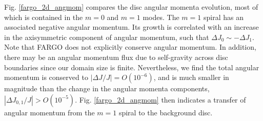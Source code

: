 Fig. \ref{fargo_2d_angmom} compares the disc angular momenta
evolution, most of which is contained in the $m=0$ and $m=1$ modes. 
The $m=1$ spiral has an associated negative angular
momentum. Its growth is correlated with an increase in the axisymmetric
component of angular momentum, such that $\Delta J_0 \sim - \Delta
J_1$. Note that FARGO does not explicitly conserve angular
momentum. In addition, there may be an angular momentum flux due to
self-gravity across disc boundaries since our domain size is finite. 
Nevertheless, we find the total angular momentum is conserved to 
$|\Delta J/J|= O(10^{-6})$, and is much smaller in magnitude than the change in the
angular momenta components, $|\Delta J_{0,1}/J|> O(10^{-5})$. 
Fig. \ref{fargo_2d_angmom} then indicates a transfer of 
angular momentum from the $m=1$ spiral to the background disc. 


